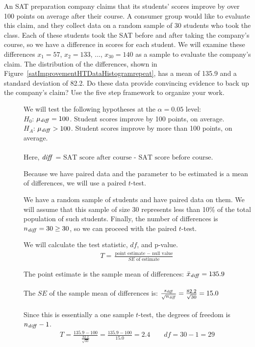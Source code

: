 \begin{examplewrap}
\begin{nexample}
{An SAT preparation company claims that its students' scores improve by over 100 points on average after their course. A consumer group would like to evaluate this claim, and they collect data on a random sample of 30 students who took the class. Each of these students took the SAT before and after taking the company's course, so we have a difference in scores for each student. We will examine these differences $x_1=57$, $x_2=133$, ..., $x_{30}=140$ as a sample to evaluate the company's claim. The distribution of the differences, shown in Figure~\ref{satImprovementHTDataHistogramrepeat}, has a mean of 135.9 and a standard deviation of 82.2. Do these data provide convincing evidence to back up the company's claim?  Use the five step framework to organize your work.  
}
\begin{description}
\item[] We will test the following hypotheses at the $\alpha=0.05$ level:\\
$H_0$: $\mu_{\text{\emph{diff}}} = 100$. Student scores improve by 100 points, on average.   \\
$H_A$: $\mu_{\text{\emph{diff}}} > 100$. Student scores improve by more than 100 points, on average.
\\
\\
Here,  ${\text{\emph{diff}}}$ = ${\text{SAT score after course - SAT score before course}}$.

\item[] Because we have paired data and the parameter to be estimated is a mean of differences, we will use a paired $t$-test.

\item[] We have a random sample of students and have paired data on them.  We will assume that this sample of size 30 represents less than 10\% of the total population of such students.  Finally, the number of differences is $n_{\text{\emph{diff}}}=30\ge 30$, so we can proceed with the paired $t$-test.  
 
\item[]  We will calculate the test statistic, $df$, and p-value.
\begin{align*}
T = \frac{\text{point estimate } - \text{ null value}}{SE \text{ of estimate}}
\end{align*}

The point estimate is the sample mean of differences:  $\bar{x}_{\text{\emph{diff}}}  = 135.9$ 
\\
\\
The $SE$ of the sample mean of differences is:  $\frac{s_{\text{\emph{diff}}} }{\sqrt{n_{\text{\emph{diff}}} }} = \frac{82.2}{\sqrt{30}} = 15.0$
\\
\\
Since this is essentially a one sample $t$-test, the degrees of freedom is $n_{\text{\emph{diff}}}-1$.
\begin{align*}
T = \frac{135.9-100}{\frac{82.2}{\sqrt{30}}} = \frac{135.9-100}{15.0}=2.4 \qquad df=30-1=29
\end{align*}


\end{description}
\end{nexample}
\end{examplewrap}
